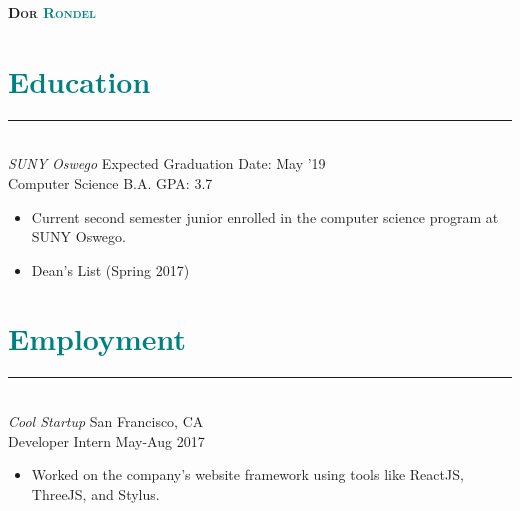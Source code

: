 \documentclass[11pt]{article}
\begin{document}
\setlength{\voffset}{-0.5in}

\centerline{
    \Huge{
        \textsc{
            \textbf{
                Dor \textcolor{teal}{Rondel}}
            }
    }
} 
\hfill \break 
\begin{minipage}{0.45\linewidth}
\end{minipage}
\begin{minipage}{0.45\linewidth}
\end{minipage}


\section*{\textcolor{teal}{Education}}
\hrule
\vspace{4px}
\hfill
\\
\textit{
    \large{SUNY Oswego}
}
\hfill
\small{Expected Graduation Date: May '19} \\
\small{Computer Science B.A.}
\hfill
GPA: 3.7  
\begin{itemize}
    \item Current second semester junior enrolled in the computer science program at SUNY Oswego.
    \item Dean's List (Spring 2017)
\end{itemize}

\section*{\textcolor{teal}{Employment}}
\hrule
\vspace{4px}
\hfill \\
\textit{
    \large{Cool Startup}
}
\hfill
\small{San Francisco, CA} \\
\small{Developer Intern}
\hfill
May-Aug 2017 
\begin{itemize}
    \item Worked on the company's website framework using tools like ReactJS, ThreeJS, and Stylus.
\end{itemize}
\end{document}
